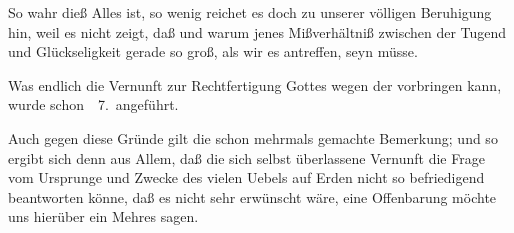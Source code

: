 \begin{aufza}
\begin{aufzb}
\begin{aufzc}
\end{aufzc}\par
   So wahr dieß Alles ist, so wenig reichet es doch zu unserer völligen Beruhigung hin, weil es nicht zeigt, daß und warum jenes Mißverhältniß zwischen der Tugend und Glückseligkeit gerade so groß, als wir es antreffen, seyn müsse.
\item Was endlich die Vernunft zur Rechtfertigung Gottes wegen der  vorbringen kann, wurde schon \ \no\,7.\ angeführt.\par
Auch gegen diese Gründe gilt die schon mehrmals gemachte Bemerkung; und so ergibt sich denn aus Allem, daß die sich selbst überlassene Vernunft die Frage vom Ursprunge und Zwecke des vielen Uebels auf Erden nicht so befriedigend beantworten könne, daß es nicht sehr erwünscht wäre, eine Offenbarung möchte uns hierüber ein Mehres sagen.
\end{aufzb}
\end{aufza}
   
